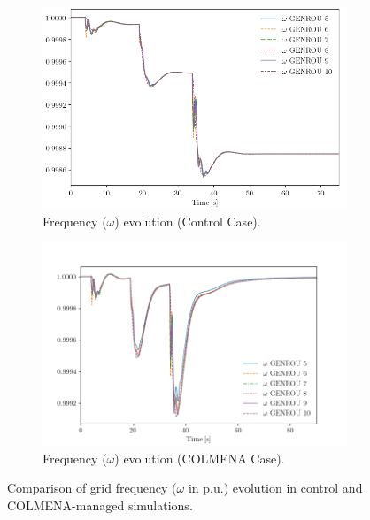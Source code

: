 \documentclass{article}
\begin{document}
\begin{figure}[h!]
    \centering
    \begin{subfigure}[t]{0.60\textwidth}
        \centering
        \includegraphics[width=\linewidth]{plots/control_omega2.png}
        \caption{Frequency ($\omega$) evolution (Control Case).}
        \label{fig:control_omega}
    \end{subfigure}
    \hfill
    \begin{subfigure}[t]{0.65\textwidth}
        \centering
        \includegraphics[width=\linewidth]{plots/genrou_omega.png}
        \caption{Frequency ($\omega$) evolution (COLMENA Case).}
        \label{fig:colmena_omega}
    \end{subfigure}
    \caption{Comparison of grid frequency ($\omega$ in p.u.) evolution in control and COLMENA-managed simulations.}
    \label{fig:omega_comparison}
\end{figure}
\end{document}
